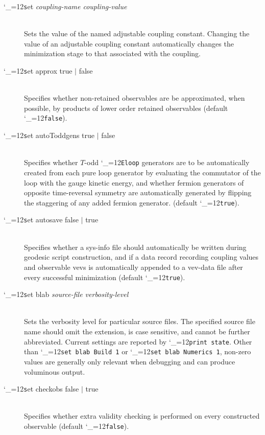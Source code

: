 \documentclass [12pt]{article}
\makeatletter
\renewcommand{\tt}{\begingroup\catcode`_=12\def\_{\string_}\tt@}
\newcommand{\tt@}[1]{\texttt{#1}\endgroup}
\makeatother
\begin{document}
\begin{description}
\item [\tt set {\it coupling-name coupling-value}]~\\
    Sets the value of the named adjustable coupling constant.
    Changing the value of an adjustable coupling constant
    automatically changes the minimization stage to that
    associated with the coupling.

\item [\tt set approx true $\vert$ false]~\\
    Specifies whether non-retained observables are
    be approximated, when possible, by products of
    lower order retained observables (default \tt{false}).

\item [\tt set autoToddgens true $\vert$ false]~\\
    Specifies whether $T$-odd
    \tt{Eloop} generators are to be automatically
    created from each pure loop generator by
    evaluating the commutator of the loop with
    the gauge kinetic energy, and whether fermion generators
    of opposite time-reversal symmetry are automatically generated
    by flipping the staggering of any added fermion generator.
    (default \tt{true}).

\item [\tt set autosave false $\vert$ true]~\\
    Specifies whether a sys-info file should automatically be
    written during geodesic script
    construction, and if a data record recording
    coupling values and observable vevs is automatically appended
    to a vev-data file after every successful minimization
    (default \tt{true}).

\item [\tt set blab {\it source-file verbosity-level}]~\\
    Sets the verbosity level for particular source files.
    The specified source file name should omit the
    extension, is case sensitive, and cannot be further abbreviated.
    Current settings are reported by \tt{print state}.
    Other than \tt{set blab Build 1} or \tt{set blab Numerics 1},
    non-zero values are generally only relevant when
    debugging and can produce voluminous output.

\item [\tt set checkobs false $\vert$ true]~\\
    Specifies whether extra validity checking is performed
    on every constructed observable (default \tt{false}).


\end{description}
\end{document}
